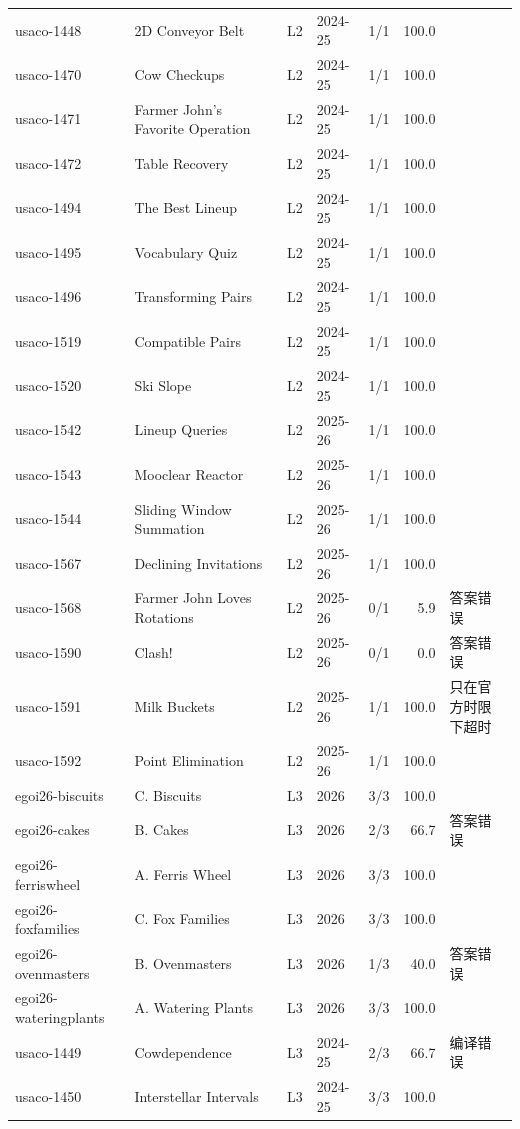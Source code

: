 \documentclass[11pt,a4paper,fontset=none]{ctexart}
\begin{document}
{\begin{longtable}{@{}l>{\raggedright\arraybackslash}p{3.4cm}llrr>{\raggedright\arraybackslash}p{3.1cm}@{}}
usaco-1448 & 2D Conveyor Belt & L2 & 2024-25 & 1/1 & 100.0 &  \\
usaco-1470 & Cow Checkups & L2 & 2024-25 & 1/1 & 100.0 &  \\
usaco-1471 & Farmer John's Favorite Operation & L2 & 2024-25 & 1/1 & 100.0 &  \\
usaco-1472 & Table Recovery & L2 & 2024-25 & 1/1 & 100.0 &  \\
usaco-1494 & The Best Lineup & L2 & 2024-25 & 1/1 & 100.0 &  \\
usaco-1495 & Vocabulary Quiz & L2 & 2024-25 & 1/1 & 100.0 &  \\
usaco-1496 & Transforming Pairs & L2 & 2024-25 & 1/1 & 100.0 &  \\
usaco-1519 & Compatible Pairs & L2 & 2024-25 & 1/1 & 100.0 &  \\
usaco-1520 & Ski Slope & L2 & 2024-25 & 1/1 & 100.0 &  \\
usaco-1542 & Lineup Queries & L2 & 2025-26 & 1/1 & 100.0 &  \\
usaco-1543 & Mooclear Reactor & L2 & 2025-26 & 1/1 & 100.0 &  \\
usaco-1544 & Sliding Window Summation & L2 & 2025-26 & 1/1 & 100.0 &  \\
usaco-1567 & Declining Invitations & L2 & 2025-26 & 1/1 & 100.0 &  \\
usaco-1568 & Farmer John Loves Rotations & L2 & 2025-26 & 0/1 & 5.9 & 答案错误 \\
usaco-1590 & Clash! & L2 & 2025-26 & 0/1 & 0.0 & 答案错误 \\
usaco-1591 & Milk Buckets & L2 & 2025-26 & 1/1 & 100.0 & 只在官方时限下超时 \\
usaco-1592 & Point Elimination & L2 & 2025-26 & 1/1 & 100.0 &  \\
egoi26-biscuits & C. Biscuits & L3 & 2026 & 3/3 & 100.0 &  \\
egoi26-cakes & B. Cakes & L3 & 2026 & 2/3 & 66.7 & 答案错误 \\
egoi26-ferriswheel & A. Ferris Wheel & L3 & 2026 & 3/3 & 100.0 &  \\
egoi26-foxfamilies & C. Fox Families & L3 & 2026 & 3/3 & 100.0 &  \\
egoi26-ovenmasters & B. Ovenmasters & L3 & 2026 & 1/3 & 40.0 & 答案错误 \\
egoi26-wateringplants & A. Watering Plants & L3 & 2026 & 3/3 & 100.0 &  \\
usaco-1449 & Cowdependence & L3 & 2024-25 & 2/3 & 66.7 & 编译错误 \\
usaco-1450 & Interstellar Intervals & L3 & 2024-25 & 3/3 & 100.0 &  \\

\end{longtable}}
\end{document}
